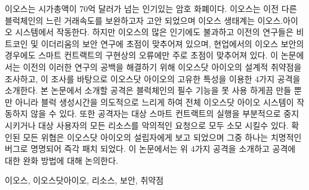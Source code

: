 
\begin{abstract2}

이오스는 시가총액이 70억 달러가 넘는 인기있는 암호 화폐이다. 이오스는 이전 다른 블럭체인의 느린 거래속도를 보완하고자 고안 되었으며 이오스 생태계는 이오스.아이오 시스템에서 작동한다. 하지만 이오스의 많은 인기에도 불과하고 이전의 연구들은 비트코인 및 이더리움의 보안 연구에 초점이 맞추어져 있으며, 현업에서의 이오스 보안의 경우에도 스마트 컨트랙트의 구현상의 오류에만 주로 초점이 맞추어져 있다. 이 논문에서는 이전의 이러한 연구의 공백을 해결하기 위해 이오스닷 아이오의 설계적 취약점을 조사하고, 이 조사를 바탕으로 이오스닷 아이오의 고유한 특성을 이용한 4가지 공격을 소개한다. 본 논문에서 소개할 공격은 블럭체인의 필수 기능을 못 사용 하게끔 만들 뿐만 아니라 블럭 생성시간을 의도적으로 느리게 하여 전체 이오스닷 아이오 시스템이 작동하지 않을 수 있다. 또한 공격자는 대상 스마트 컨트랙트의 실행을 부분적으로 중지 시키거나 대상 사용자의 모든 리소스를 악의적인 요청으로 모두 소모 시킬수 있다. 확인된 모든 위협은 이오스닷 아이오의 설립자에게 보고 되었으며 그중 하나는 치명적인 버그로 명명되어 즉각 패치 되었다. 이 논문에서는 위 4가지 공격을 소개하고 공격에 대한 완화 방법에 대해 논의한다.

\end{abstract2}

\begin{Engkeyword2}
	이오스, 이오스닷아이오, 리소스, 보안, 취약점
\end{Engkeyword2}